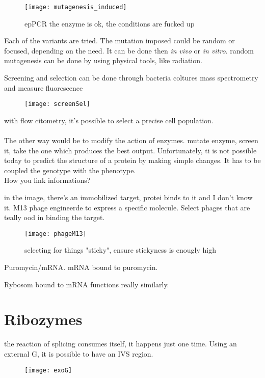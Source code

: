 \begin{figure}[h]
\caption{epPCR the enzyme is ok, the conditions are fucked up}
\centering
\texttt{[image: mutagenesis\_induced]}
\label{}
\end{figure}

Each of the variants are tried. The mutation imposed could be random or focused, depending on the need. It can be done then \textit{in vivo} or \textit{in vitro}. random mutagenesis can be done by using physical tools, like radiation. 


Screening and selection can be done through bacteria coltures mass spectrometry and measure fluorescence

\begin{figure}[h]
\caption{}
\centering
\texttt{[image: screenSel]}
\label{}
\end{figure}

with flow citometry, it's possible to select a precise cell population.\\
\\
The other way would be to modify the action of enzymes. mutate enzyme, screen it, take the one which produces the best output. Unfortunately, ti is not possible today to predict the structure of a protein by making simple changes. It has to be coupled the genotype with the phenotype. \\
How you link informations?

in the image, there's an immobilized target, protei binds to it and I don't know it. M13 phage engineerde to express a specific molecule. Select phages that are teally ood in binding the target. 

\begin{figure}[h]
\caption{selecting for things "sticky", ensure stickyness is enougly high}
\centering
\texttt{[image: phageM13]}
\label{}
\end{figure}

Puromycin/mRNA. mRNA bound to puromycin.

Rybosom bound to mRNA functions really similarly.  

\section{Ribozymes}
the reaction of splicing consumes itself, it happens just one time. Using an external G, it is possible to have an IVS region.

\begin{figure}[h]
\caption{}
\centering
\texttt{[image: exoG]}
\label{}
\end{figure}


